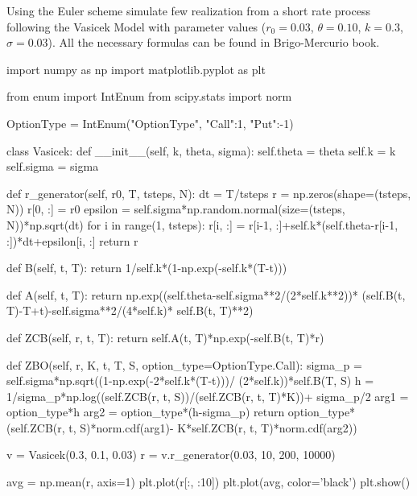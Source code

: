 \documentclass[12pt,a4paper]{book}
\begin{document}
\begin{exercise}[subtitle=Vasicek Model (\texttt{python})]
Using the Euler scheme simulate few realization from a short rate process following the Vasicek Model with parameter values ($r_0=0.03$, $\theta=0.10$, $k=0.3$, $\sigma=0.03$).
All the necessary formulas can be found in Brigo-Mercurio book.
\end{exercise}
\begin{solution}
\begin{ipython}
import numpy as np
import matplotlib.pyplot as plt

from enum import IntEnum
from scipy.stats import norm

OptionType = IntEnum("OptionType", {"Call":1, "Put":-1})

class Vasicek:
    def __init__(self, k, theta, sigma):
        self.theta = theta
        self.k = k
        self.sigma = sigma

    def r_generator(self, r0, T, tsteps, N):
        dt = T/tsteps
        r = np.zeros(shape=(tsteps, N))
        r[0, :] = r0
        epsilon = self.sigma*np.random.normal(size=(tsteps, N))*np.sqrt(dt)
        for i in range(1, tsteps):
            r[i, :] = r[i-1, :]+self.k*(self.theta-r[i-1, :])*dt+epsilon[i, :]
        return r

    def B(self, t, T):
        return 1/self.k*(1-np.exp(-self.k*(T-t)))

    def A(self, t, T):
        return np.exp((self.theta-self.sigma**2/(2*self.k**2))*
                       (self.B(t, T)-T+t)-self.sigma**2/(4*self.k)*
                       self.B(t, T)**2)

    def ZCB(self, r, t, T):
        return self.A(t, T)*np.exp(-self.B(t, T)*r)

    def ZBO(self, r, K, t, T, S, option_type=OptionType.Call):
        sigma_p = self.sigma*np.sqrt((1-np.exp(-2*self.k*(T-t)))/
                  (2*self.k))*self.B(T, S)
        h = 1/sigma_p*np.log((self.ZCB(r, t, S))/(self.ZCB(r, t, T)*K))+
            sigma_p/2
        arg1 = option_type*h
        arg2 = option_type*(h-sigma_p)
        return option_type*(self.ZCB(r, t, S)*norm.cdf(arg1)-
               K*self.ZCB(r, t, T)*norm.cdf(arg2))

v = Vasicek(0.3, 0.1, 0.03)
r = v.r_generator(0.03, 10, 200, 10000)

avg = np.mean(r, axis=1)
plt.plot(r[:, :10])
plt.plot(avg, color='black')
plt.show()
\end{ipython}
\end{solution}
\end{document}
